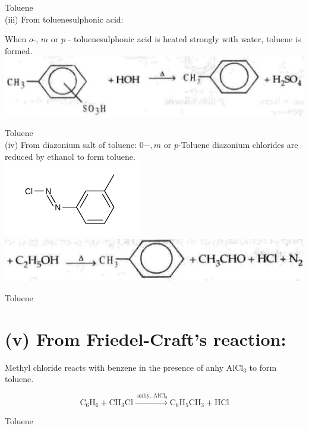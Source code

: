 \documentclass[10pt]{article}
\begin{document}
Toluene\\
(iii) From toluenesulphonic acid:

When $o$-, $m$ or $p$ - toluenesulphonic acid is heated strongly with water, toluene is formed.\\
\includegraphics[max width=\textwidth, center]{2025_01_28_8470952b98110cec3aabg-213(3)}

Toluene\\
(iv) From diazonium salt of toluene: $0-, m$ or $p$-Toluene diazonium chlorides are reduced by ethanol to form toluene.\\
\includegraphics{smile-b6d279148e5d1bd4729dc21677870ea622cc25a2}\\
\includegraphics[max width=\textwidth, center]{2025_01_28_8470952b98110cec3aabg-214(2)}

Toluene

\section*{(v) From Friedel-Craft's reaction:}
Methyl chloride reacts with benzene in the presence of anhy $\mathrm{AlCl}_{3}$ to form toluene.

$$
\mathrm{C}_{6} \mathrm{H}_{6}+\mathrm{CH}_{3} \mathrm{Cl} \xrightarrow{\text { anhy. } \mathrm{AlCl}_{3}} \mathrm{C}_{6} \mathrm{H}_{5} \mathrm{CH}_{3}+\mathrm{HCl}
$$

Toluene
\end{document}
